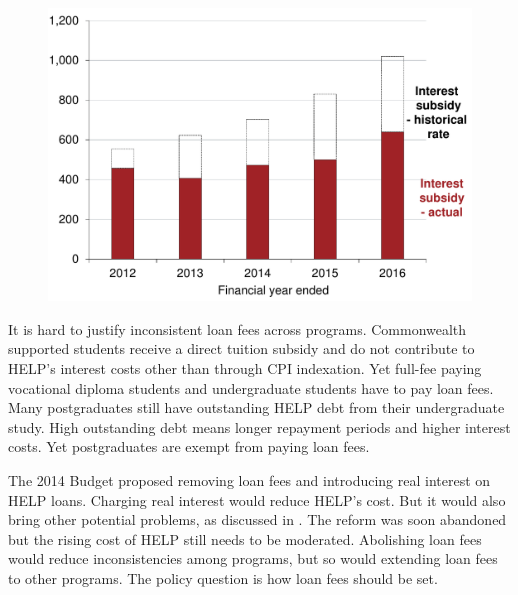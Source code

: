 \documentclass[embargoed]{grattan}
\begin{document}
{\begin{figure}
\includegraphics[page=19]{atlas/Chartpack.pdf}

\end{figure}

It is hard to justify inconsistent loan fees across programs.
Commonwealth supported students receive a direct tuition subsidy and do not contribute to \gls{HELP}'s interest costs other than through \gls{CPI} indexation.
Yet full-fee paying vocational diploma students and undergraduate students have to pay loan fees.
Many postgraduates still have outstanding \gls{HELP} debt from their undergraduate study.
High outstanding debt means longer repayment periods and higher interest costs.
Yet postgraduates are exempt from paying loan fees.

The 2014 Budget proposed removing loan fees and introducing real interest on \gls{HELP} loans.
Charging real interest would reduce \gls{HELP}'s cost.
But it would also bring other potential problems, as discussed in .
The reform was soon abandoned but the rising cost of \gls{HELP} still needs to be moderated.
Abolishing loan fees would reduce inconsistencies among programs, but so would extending loan fees to other programs.
The policy question is how loan fees should be set.

}
\end{document}
